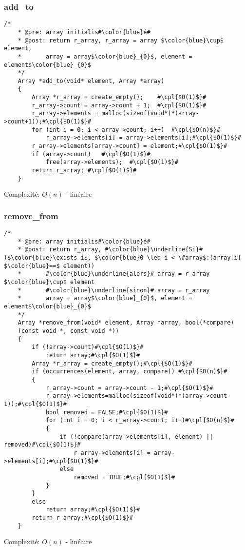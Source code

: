 \documentclass[a4paper, 11pt, oneside]{article}
\begin{document}
	\subsubsection{add\_to}
	\begin{lstlisting}[mathescape]
	/*
	* @pre: array initialis#\color{blue}é#
	* @post: return r_array, r_array = array $\color{blue}\cup$ element,
	*		array = array$\color{blue}_{0}$, element = element$\color{blue}_{0}$
	*/
	Array *add_to(void* element, Array *array) 
	{
		Array *r_array = create_empty();	#\cpl{$O(1)$}#
		r_array->count = array->count + 1;	#\cpl{$O(1)$}#
		r_array->elements = malloc(sizeof(void*)*(array->count+1));#\cpl{$O(1)$}#
		for (int i = 0; i < array->count; i++)	#\cpl{$O(n)$}#
			r_array->elements[i] = array->elements[i];#\cpl{$O(1)$}#
		r_array->elements[array->count] = element;#\cpl{$O(1)$}#
		if (array->count)	#\cpl{$O(1)$}#
			free(array->elements);	#\cpl{$O(1)$}#
		return r_array;	#\cpl{$O(1)$}#
	}
	\end{lstlisting}
	Complexité: $O(n)$ - linéaire
	\clearpage
	\subsubsection{remove\_from}
	\begin{lstlisting}[mathescape]
	/*
	* @pre: array initialis#\color{blue}é#
	* @post: return r_array, #\color{blue}\underline{Si}# ($\color{blue}\exists i$, $\color{blue}0 \leq i < \#array$:(array[i] $\color{blue}==$ element)) 
	*		#\color{blue}\underline{alors}# array = r_array $\color{blue}\cup$ element
	*		#\color{blue}\underline{sinon}# array = r_array
	*		array = array$\color{blue}_{0}$, element = element$\color{blue}_{0}$
	*/
	Array *remove_from(void* element, Array *array, bool(*compare)    
	(const void *, const void *)) 
	{
		if (!array->count)#\cpl{$O(1)$}#
			return array;#\cpl{$O(1)$}#
		Array *r_array = create_empty();#\cpl{$O(1)$}#
		if (occurrences(element, array, compare)) #\cpl{$O(n)$}#
		{
			r_array->count = array->count - 1;#\cpl{$O(1)$}#
			r_array->elements=malloc(sizeof(void*)*(array->count-1));#\cpl{$O(1)$}#
			bool removed = FALSE;#\cpl{$O(1)$}#
			for (int i = 0; i < r_array->count; i++)#\cpl{$O(n)$}#
			{	
				if (!compare(array->elements[i], element) || removed)#\cpl{$O(1)$}#
					r_array->elements[i] = array->elements[i];#\cpl{$O(1)$}#
				else
					removed = TRUE;#\cpl{$O(1)$}#
			}
		}
		else 
			return array;#\cpl{$O(1)$}#
		return r_array;#\cpl{$O(1)$}#
	}
	\end{lstlisting}
	Complexité: $O(n)$ - linéaire
	
\end{document}
